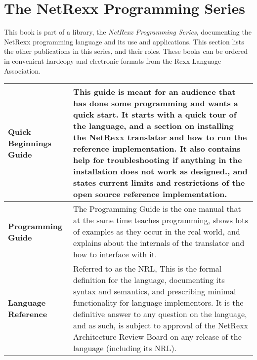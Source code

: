 \chapter{The NetRexx Programming Series}
This book is part of a library, the \emph{NetRexx Programming Series}, documenting the NetRexx programming language and its use and applications. This section lists the other publications in this series, and their roles. These books can be ordered in convenient hardcopy and electronic formats from the Rexx Language Association.
\newline
\newline
\newline
\begin{tabularx}{\textwidth}{>{\bfseries}lX}
\toprule
Quick Beginnings Guide & This guide is meant for an audience that has done some programming and wants a quick start. It starts with a quick tour of the language, and a section on installing the NetRexx translator and how to run the reference implementation. It also contains help for troubleshooting if anything in the installation does not work as designed., and states current limits and restrictions of the open source reference implementation.
\\\midrule
Programming Guide & The Programming Guide is the one manual that at the same time teaches programming, shows lots of examples as they occur in the real world, and explains about the internals of the translator and how to interface with it.
\\\midrule
Language Reference & Referred to as the NRL, This is the formal definition for the language, documenting its syntax and semantics, and prescribing minimal functionality for language implementors. It is the definitive answer to any question on the language, and as such, is subject to approval of the NetRexx Architecture Review Board on any release of the language (including its NRL).
\\\bottomrule
\end{tabularx}
